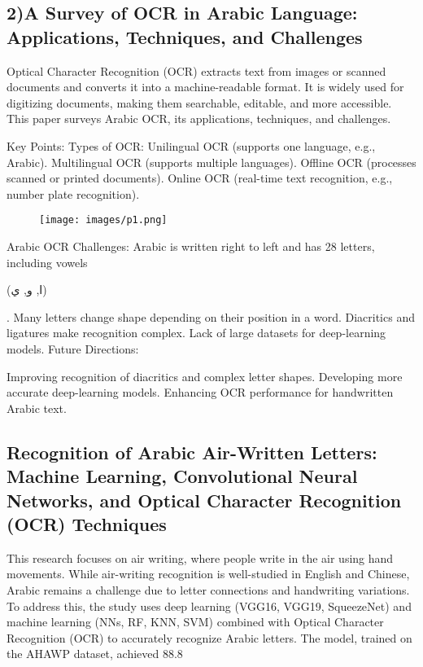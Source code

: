 \documentclass{article}
\begin{document}
\subsection{2)A Survey of OCR in Arabic Language: Applications,
 					Techniques, and Challenges}
                    Optical Character Recognition (OCR) extracts text from images or scanned documents and converts it into a machine-readable format. It is widely used for digitizing documents, making them searchable, editable, and more accessible. This paper surveys Arabic OCR, its applications, techniques, and challenges.

Key Points: Types of OCR:
Unilingual OCR (supports one language, e.g., Arabic).
Multilingual OCR (supports multiple languages).
Offline OCR (processes scanned or printed documents).
 Online OCR (real-time text recognition, e.g., number plate recognition).
 \begin{figure}[H]
     \centering
     \texttt{[image: images/p1.png]}
     \label{fig:enter-label}
 \end{figure}

Arabic OCR Challenges:
Arabic is written right to left and has 28 letters, including vowels \begin{otherlanguage}{arabic}(ا, و, ي)
\end{otherlanguage}.
Many letters change shape depending on their position in a word.
Diacritics and ligatures make recognition complex.
Lack of large datasets for deep-learning models.
Future Directions:

Improving recognition of diacritics and complex letter shapes.
Developing more accurate deep-learning models.
Enhancing OCR performance for handwritten Arabic text.
\subsection{Recognition of Arabic Air-Written Letters: Machine Learning, Convolutional Neural Networks, and Optical Character
Recognition (OCR) Techniques}
This research focuses on air writing, where people write in the air using hand movements. While air-writing recognition is well-studied in English and Chinese, Arabic remains a challenge due to letter connections and handwriting variations. To address this, the study uses deep learning (VGG16, VGG19, SqueezeNet) and machine learning (NNs, RF, KNN, SVM) combined with Optical Character Recognition (OCR) to accurately recognize Arabic letters. The model, trained on the AHAWP dataset, achieved 88.8%
\end{document}
